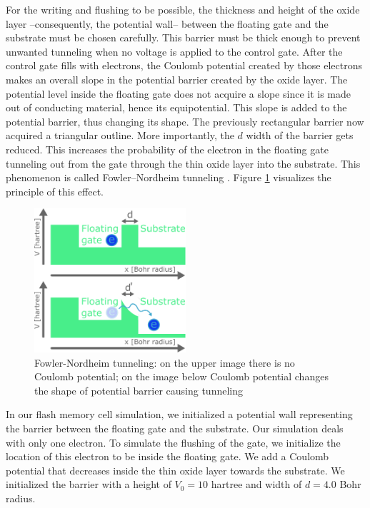 For the writing and flushing to be possible, the thickness and height of the oxide layer --consequently, the potential wall-- between the floating gate and the substrate must be chosen carefully.
This barrier must be thick enough to prevent unwanted tunneling when no voltage is applied to the control gate.
After the control gate fills with electrons, the Coulomb potential created by those electrons makes an overall slope in the potential barrier created by the oxide layer.
The potential level inside the floating gate does not acquire a slope since it is made out of conducting material, hence its equipotential.
This slope is added to the potential barrier, thus changing its shape.
The previously rectangular barrier now acquired a triangular outline. More importantly, the $d$ width of the barrier gets reduced.
This increases the probability of the electron in the floating gate tunneling out from the gate through the thin oxide layer into the substrate.
This phenomenon is called Fowler–Nordheim tunneling \cite{Fowler_1928bv}.
Figure \ref{fig:fowler_nordheim_tunneling} visualizes the principle of this effect.
\begin{figure}[hbt!]
	\centering
	\includegraphics[width=0.5\textwidth]{figures/fowler_nordheim_tunneling.pdf}
	\caption{Fowler-Nordheim tunneling: on the upper image there is no Coulomb potential; on the image below Coulomb potential changes the shape of potential barrier causing tunneling}
	\label{fig:fowler_nordheim_tunneling}
\end{figure}
In our flash memory cell simulation, we initialized a potential wall representing the barrier between the floating gate and the substrate.
Our simulation deals with only one electron.
To simulate the flushing of the gate, we initialize the location of this electron to be inside the floating gate.
We add a Coulomb potential that decreases inside the thin oxide layer towards the substrate.
We initialized the barrier with a height of $V_0 = 10$ hartree and width of $d = 4.0$ Bohr radius.
